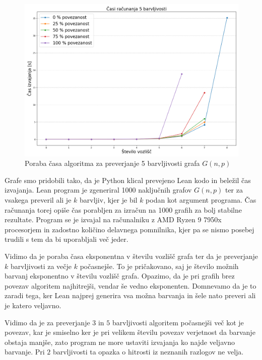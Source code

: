 \documentclass[mat1]{fmfdelo}
\begin{document}
\begin{figure}[H]
\begin{center}
\includegraphics[scale=0.35]{assets/5barvSlow}
\caption{Poraba časa algoritma za preverjanje 5 barvljivosti grafa $G(n, p)$}
\label{slika2}
\end{center}
\end{figure}

Grafe smo pridobili tako, da je Python klical prevejeno Lean kodo in beležil čas izvajanja. Lean program je zgeneriral 1000
naključnih grafov $G(n, p)$ ter za vsakega preveril ali je $k$ barvljiv, kjer je bil $k$ podan kot argument programa.
Čas računanja torej opiše čas porabljen za izračun na 1000 grafih za bolj stabilne rezultate. Program se je izvajal
na računalniku z AMD Ryzen 9 7950x procesorjem in zadostno količino delavnega pomnilnika, kjer pa se nismo posebej trudili
s tem da bi uporabljali več jeder. 

Vidimo da je poraba časa eksponentna v številu vozlišč grafa ter da je preverjanje $k$ barvljivosti za večje $k$ 
počasnejše. To je pričakovano, saj je število možnih barvanj eksponentno v številu vozlišč grafa.
Opazimo, da je pri grafih brez povezav algoritem najhitrejši, vendar še vedno eksponenten. Domnevamo da je to zaradi tega, 
ker Lean najprej generira vsa možna barvanja in šele nato preveri ali je katero veljavno. 

Vidimo da je za preverjanje $3$ in $5$ barvljivosti algoritem počasnejši več kot je povezav, kar je smiselno ker je pri velikem 
številu povezav verjetnost da barvanje obstaja manjše, zato program ne more ustaviti izvajanja ko najde veljavno barvanje. Pri $2$
barvljivosti ta opazka o hitrosti iz neznanih razlogov ne velja. 
\end{document}
